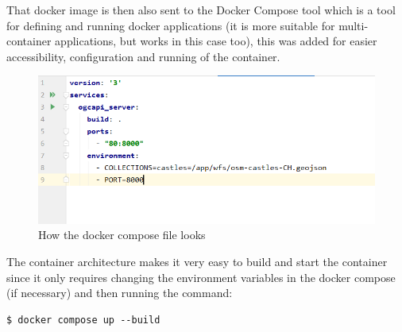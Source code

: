 That docker image is then also sent to the Docker Compose tool which is a tool for defining and running docker applications (it is more suitable for multi-container applications, but works in this case too), this was added for easier accessibility, configuration and running of the container.
\newline
\begin{figure}[H]
	\includegraphics[width=\linewidth]{./Images/ArchitectureDesign/dockercompose_image.png}
	\caption{How the docker compose file looks}
\end{figure}
The container architecture makes it very easy to build and start the container since it only requires changing the environment variables in the docker compose (if necessary) and then running the command:
\begin{verbatim}
$ docker compose up --build
\end{verbatim}
\newpage

